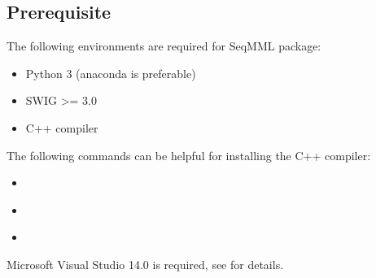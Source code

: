 \documentclass[letterpaper,10pt,english]{sphinxmanual}
\begin{document}
\subsection{Prerequisite}
\label{\detokenize{installation:prerequisite}}
The following environments are required for SeqMML package:
\begin{itemize}
\item {} 
Python 3 (anaconda is preferable)

\item {} 
SWIG \textgreater{}= 3.0

\item {} 
C++ compiler

\end{itemize}

The following commands can be helpful for installing the C++ compiler:
\begin{itemize}
\item {} 

\end{itemize}

\begin{sphinxVerbatim}[commandchars=\\\{\}]
    
\end{sphinxVerbatim}
\begin{itemize}
\item {} 

\end{itemize}

\begin{sphinxVerbatim}[commandchars=\\\{\}]
 
\end{sphinxVerbatim}
\begin{itemize}
\item {} 

\end{itemize}

Microsoft Visual Studio 14.0 is required, see  for details.
\end{document}
